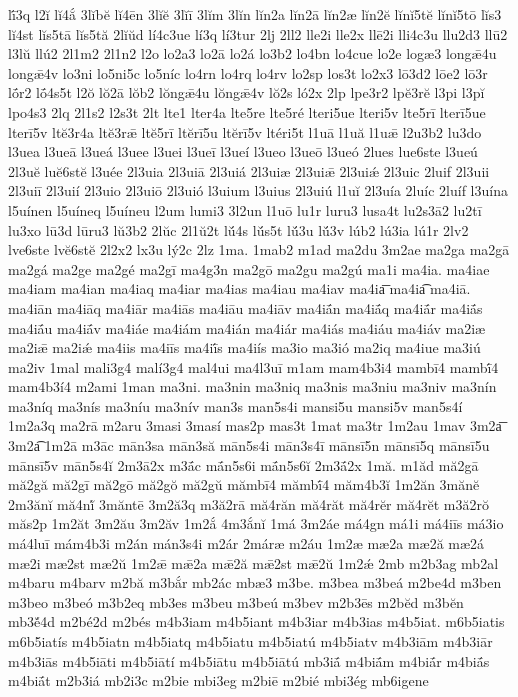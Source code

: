 {lī́3q
l2ĭ
lĭ4ắ
3lĭbĕ
lĭ4ēn
3lĭĕ
3lĭī
3lĭm
3lĭn
lĭn2a
lĭn2ā
lĭn2æ
lĭn2ĕ
lĭnĭ5tĕ
lĭnĭ5tō
lĭs3
lĭ4st
lĭs5tā
lĭs5tă
2lĭŭd
lí4c3ue
lí3q
lí3tur
2lj
2ll2
lle2i
lle2x
llē2i
lli4c3u
llu2d3
llū2
l3lŭ
llú2
2l1m2
2l1n2
l2o
lo2a3
lo2ā
lo2á
lo3b2
lo4bn
lo4cue
lo2e
logæ3
longǣ4u
longǣ4v
lo3ni
lo5ni5c
lo5níc
lo4rn
lo4rq
lo4rv
lo2sp
los3t
lo2x3
lō3d2
lōe2
lō3r
lṓr2
lṓ4s5t
l2ŏ
lŏ2ā
lŏb2
lŏngǣ4u
lŏngǣ4v
lŏ2s
ló2x
2lp
lpe3r2
lpĕ3rĕ
l3pi
l3pĭ
lpo4s3
2lq
2l1s2
l2s3t
2lt
lte1
lter4a
lte5re
lte5ré
lteri5ue
lteri5v
lte5rī
lterī5ue
lterī5v
ltĕ3r4a
ltĕ3rǣ
ltĕ5rī
ltĕrī5u
ltĕrī5v
ltéri5t
l1uā
l1uă
l1uǣ
l2u3b2
lu3do
l3uea
l3ueā
l3ueá
l3uee
l3uei
l3ueī
l3ueí
l3ueo
l3ueō
l3ueó
2lues
lue6ste
l3ueú
2l3uĕ
luĕ6stĕ
l3uée
2l3uia
2l3uiā
2l3uiá
2l3uiæ
2l3uiǣ
2l3uiǽ
2l3uic
2luif
2l3uii
2l3uiī
2l3uií
2l3uio
2l3uiō
2l3uió
l3uium
l3uius
2l3uiú
l1uĭ
2l3uía
2luíc
2luíf
l3uína
l5uínen
l5uíneq
l5uíneu
l2um
lumi3
3l2un
l1uō
lu1r
luru3
lusa4t
lu2s3ā2
lu2tī
lu3xo
lū3d
lūru3
lŭ3b2
2lŭc
2l1ŭ2t
lŭ́4s
lŭ́s5t
lŭ́3u
lŭ́3v
lúb2
lú3ia
lú1r
2lv2
lve6ste
lvĕ6stĕ
2l2x2
lx3u
lý2c
2lz
1ma.
1mab2
m1ad
ma2du
3m2ae
ma2ga
ma2gā
ma2gá
ma2ge
ma2gé
ma2gī
ma4g3n
ma2gō
ma2gu
ma2gú
ma1i
ma4ia.
ma4iae
ma4iam
ma4ian
ma4iaq
ma4iar
ma4ias
ma4iau
ma4iav
ma4ia͞
ma4ia͡
ma4iā.
ma4iān
ma4iāq
ma4iār
ma4iās
ma4iāu
ma4iāv
ma4iā́n
ma4iā́q
ma4iā́r
ma4iā́s
ma4iā́u
ma4iā́v
ma4iáe
ma4iám
ma4ián
ma4iár
ma4iás
ma4iáu
ma4iáv
ma2iæ
ma2iǣ
ma2iǽ
ma4iis
ma4iīs
ma4iī́s
ma4iís
ma3io
ma3ió
ma2iq
ma4iue
ma3iú
ma2iv
1mal
mali3g4
malí3g4
mal4ui
ma4l3uī
m1am
mam4b3i4
mambī4
mambī́4
mam4b3í4
m2ami
1man
ma3ni.
ma3nin
ma3niq
ma3nis
ma3niu
ma3niv
ma3nín
ma3níq
ma3nís
ma3níu
ma3nív
man3s
man5s4i
mansi5u
mansi5v
man5s4í
1m2a3q
ma2rā
m2aru
3masi
3masí
mas2p
mas3t
1mat
ma3tr
1m2au
1mav
3m2a͞
3m2a͡
1m2ā
m3āc
mān3sa
mān3să
mān5s4i
mān3s4ī
mānsī5n
mānsī5q
mānsī5u
mānsī5v
mān5s4ĭ
2m3ā2x
m3ā́c
mā́n5s6i
mā́n5s6ĭ
2m3ā́2x
1mă.
m1ăd
mă2gā
mă2gă
mă2gī
mă2gō
mă2gŏ
mă2gŭ
mămbī4
mămbī́4
măm4b3ĭ
1m2ăn
3mănĕ
2m3ănĭ
mă4nĭ́
3măntē
3m2ă3q
m3ă2rā
mă4răn
mă4răt
mă4rĕr
mă4rĕt
m3ă2rŏ
măs2p
1m2ăt
3m2ău
3m2ăv
1m2ắ
4m3ắnĭ
1má
3m2áe
má4gn
má1i
má4iīs
má3io
má4luī
mám4b3i
m2án
mán3s4i
m2ár
2máræ
m2áu
1m2æ
mæ2a
mæ2ă
mæ2á
mæ2i
mæ2st
mæ2ŭ
1m2ǣ
mǣ2a
mǣ2ă
mǣ2st
mǣ2ŭ
1m2ǽ
2mb
m2b3ag
mb2al
m4baru
m4barv
m2bă
m3bắr
mb2ác
mbæ3
m3be.
m3bea
m3beá
m2be4d
m3ben
m3beo
m3beó
m3b2eq
mb3es
m3beu
m3beú
m3bev
m2b3ēs
m2bĕd
m3bĕn
mb3ĕ́4d
m2bé2d
m2bés
m4b3iam
m4b5iant
m4b3iar
m4b3ias
m4b5iat.
m6b5iatis
m6b5iatís
m4b5iatn
m4b5iatq
m4b5iatu
m4b5iatú
m4b5iatv
m4b3iām
m4b3iār
m4b3iās
m4b5iāti
m4b5iātí
m4b5iātu
m4b5iātú
mb3iā́
m4biā́m
m4biā́r
m4biā́s
m4biā́t
m2b3iá
mb2i3c
m2bie
mbi3eg
m2biē
m2bié
mbi3ég
mb6igene
}
